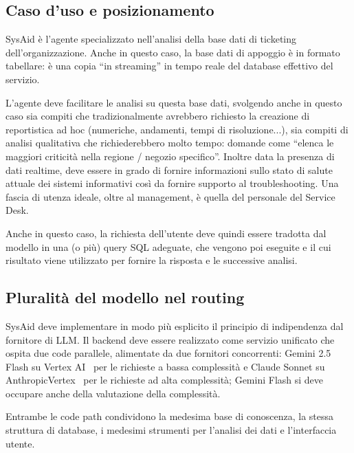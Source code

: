 \subsection{Caso d'uso e posizionamento}
\label{subsec:sysaid-caso-uso}

SysAid è l'agente specializzato nell'analisi della base dati di ticketing dell'organizzazione.
Anche in questo caso, la base dati di appoggio è in formato tabellare: è una copia ``in streaming'' in tempo reale del database effettivo del servizio.

L'agente deve facilitare le analisi su questa base dati, svolgendo anche in questo caso sia compiti che tradizionalmente 
avrebbero richiesto la creazione di reportistica ad hoc
(numeriche, andamenti, tempi di risoluzione...), sia compiti di analisi qualitativa che richiederebbero molto tempo: 
domande come ``elenca le maggiori criticità nella regione / negozio specifico''.
Inoltre data la presenza di dati realtime, deve essere in grado di fornire informazioni sullo stato di salute attuale 
dei sistemi informativi così da fornire supporto al troubleshooting.
Una fascia di utenza ideale, oltre al management, è quella del personale del Service Desk.

Anche in questo caso, la richiesta dell'utente deve quindi essere tradotta dal modello in una (o più) query SQL adeguate, 
che vengono poi eseguite e il cui risultato viene utilizzato per fornire la risposta e le successive analisi.

\subsection{Pluralità del modello nel routing}
\label{subsec:agenti-sysaid-confronto}

SysAid deve implementare in modo più esplicito il principio di indipendenza dal fornitore di LLM. 
Il backend deve essere realizzato come servizio unificato che ospita due code parallele, alimentate da due fornitori concorrenti: 
Gemini 2.5 Flash su Vertex AI~\cite{gcp_vertexai} per le richieste a bassa complessità e 
Claude Sonnet su AnthropicVertex~\cite{anthropic_docs} per le richieste ad alta complessità; 
Gemini Flash si deve occupare anche della valutazione della complessità.

Entrambe le code path condividono la medesima base di conoscenza, la stessa struttura di database, 
i medesimi strumenti per l'analisi dei dati e l'interfaccia utente.

